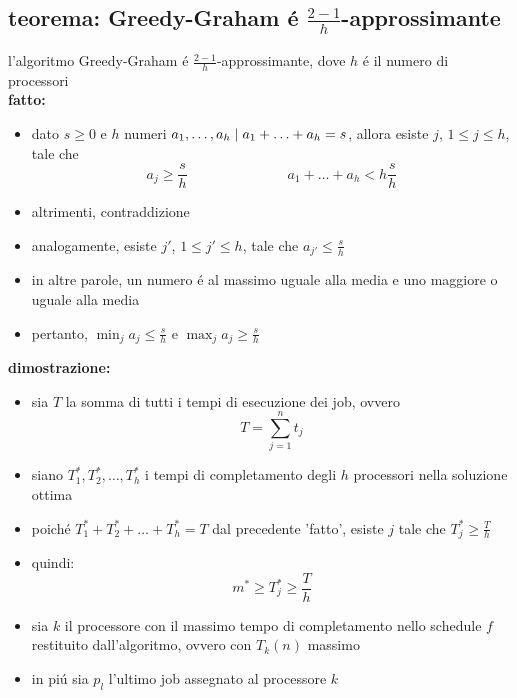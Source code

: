 \subsection*{teorema: Greedy-Graham \'e $\frac{2-1}{h}$-approssimante}
\begin{flushleft}
	l'algoritmo Greedy-Graham \'e $\frac{2-1}{h}$-approssimante, dove $h$ \'e il numero di processori \newline \\
	\vspace{0.5cm}
	\textbf{fatto:}
	\begin{itemize}
		\item dato $s\geq 0$ e $h$ numeri $a_1,\ldots,a_h\hspace{0.1cm}\vert\hspace{0.1cm}a_1+\ldots+a_h=s$, allora esiste $j$, $1\leq j\leq h$, tale che \newline
			$$a_j\geq\frac{s}{h}\hspace{3cm}a_1+\ldots+a_h<h\frac{s}{h}$$
		\item altrimenti, contraddizione
		\item analogamente, esiste $j'$, $1\leq j'\leq h$, tale che $a_{j'}\leq\frac{s}{h}$
		\item in altre parole, un numero \'e al massimo uguale alla media e uno maggiore o uguale alla media
		\item pertanto, $\min_j a_j\leq\frac{s}{h}$ e $\max_j a_j\geq\frac{s}{h}$
	\end{itemize}
	\vspace{0.5cm}
	\textbf{dimostrazione:}
	\begin{itemize}
		\item sia $T$ la somma di tutti i tempi di esecuzione dei job, ovvero
			$$T=\sum_{j=1}^n t_j$$
		\item siano $T_1^*,T_2^*,\ldots,T_h^*$ i tempi di completamento degli $h$ processori nella soluzione ottima
		\item poich\'e $T_1^*+T_2^*+\ldots+T_h^*=T$ dal precedente 'fatto', esiste $j$ tale che $T_j^*\geq\frac{T}{h}$
		\item quindi:
			$$m^*\geq T_j^*\geq\frac{T}{h}$$
		\item sia $k$ il processore con il massimo tempo di completamento nello schedule $f$ restituito dall'algoritmo, ovvero con $T_k(n)$ massimo
		\item in pi\'u sia $p_l$ l'ultimo job assegnato al processore $k$

\end{itemize}
\end{flushleft}
